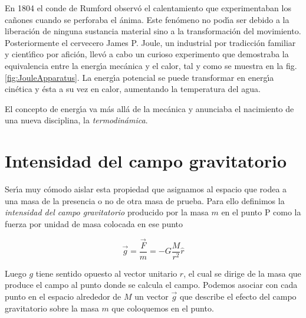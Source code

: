En 1804 el conde de Rumford observ\'o el  calentamiento que experimentaban los ca\~{n}ones cuando se perforaba el \'anima\cite{Count1804}. Este fen\'omeno no pod\'\i{}a ser debido a la liberaci\'on de ninguna sustancia material sino a la transformaci\'on del movimiento. Posteriormente el cervecero James P. Joule\cite{Joule1850}, un industrial por tradicci\'on familiar y cient\'\i{}fico por afici\'on, llev\'o a cabo un curioso experimento que demostraba la equivalencia entre la energ\'\i{}a mec\'anica y el calor, tal y como se muestra en la fig. \ref{fig:JouleApparatus}. La energ\'\i{}a potencial se puede transformar en energ\'\i{}a cin\'etica y \'esta a su vez en calor, aumentando la temperatura del agua.


El concepto de energ\'\i{}a va m\'as all\'a de la mec\'anica y anunciaba el nacimiento de una nueva disciplina, la \emph{termodin\'amica}.




\section{Intensidad del campo gravitatorio}
Ser\'\i{}a muy c\'omodo aislar esta propiedad que asignamos al espacio que rodea a una masa de la presencia o no de otra masa de prueba. Para ello definimos la \emph{intensidad del campo gravitatorio} producido por la masa $m$ en el punto P como la fuerza por unidad de masa colocada en ese punto

\begin{equation}
\vec{g}=\frac{\vec{F}}{m}=-G\frac{M}{r^2}\hat{r}
\label{eq:intensidad_campo_gravitatorio}
\end{equation}

Luego $g$ tiene sentido opuesto al vector unitario $\hat{r}$, el cual se dirige de la masa que produce el campo al punto donde se calcula el campo. Podemos asociar con cada punto en el espacio alrededor de $M$ un vector $\vec{g}$ que describe el efecto del campo gravitatorio sobre la masa $m$ que coloquemos en el punto. 



